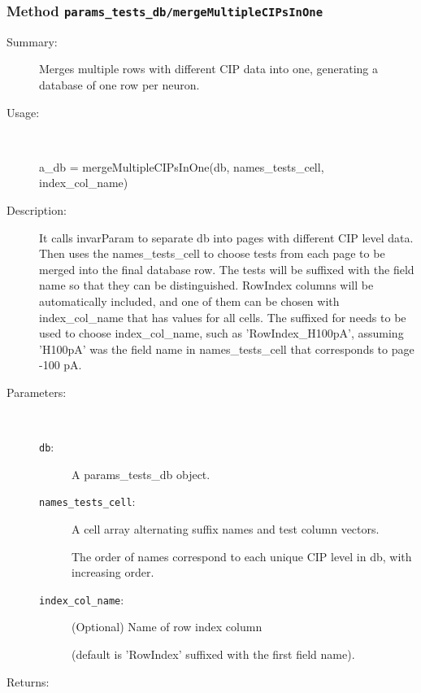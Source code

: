 \subsubsection[Method \texttt{mergeMultipleCIPsInOne}]{Method \texttt{params\_tests\_db/mergeMultipleCIPsInOne}}%
%
\label{ref_params_tests_db__mergeMultipleCIPsInOne}%
\hypertarget{ref_params_tests_db__mergeMultipleCIPsInOne}{}%
\begin{description}
\item[Summary:]Merges multiple rows with different CIP data into one, generating a database of one row per neuron.
%
\item[Usage:]~%
\begin{lyxcode}%
a\_db = mergeMultipleCIPsInOne(db, names\_tests\_cell, index\_col\_name)
%
\end{lyxcode}%
%
\item[Description:]%
It calls invarParam to separate db into pages with different CIP level data.
 Then uses the names\_tests\_cell to choose tests from each page to be merged into the 
 final database row. The tests will be suffixed with the field name so that 
 they can be distinguished. RowIndex columns
 will be automatically included, and one of them can be chosen with index\_col\_name
 that has values for all cells. The suffixed for needs to be used to 
 choose index\_col\_name, such as 'RowIndex\_H100pA', assuming 'H100pA' was the field
 name in names\_tests\_cell that corresponds to page -100 pA.
\item[Parameters:]~
\begin{description}%
\item[\texttt{db}:]
 A params\_tests\_db object.
\item[\texttt{names\_tests\_cell}:]
 A cell array alternating suffix names and test column vectors.

The order of names correspond to each unique CIP level in db, 
with increasing order.\item[\texttt{index\_col\_name}:]
 (Optional) Name of row index column 

(default is 'RowIndex' suffixed with the first field name).\end{description}%
%
\item[Returns:]~


\end{description}
